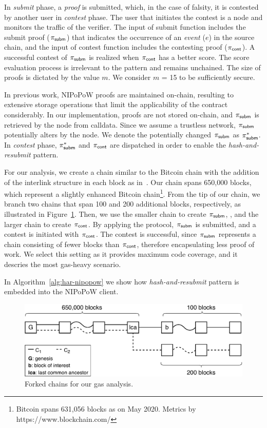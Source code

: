 In \emph{submit} phase, a \emph{proof} is submitted, which, in the case of
falsity, it is contested by another user in \emph{contest} phase. The user that
initiates the contest is a node and monitors the traffic of the verifier.  The
input of \textsf{submit} function includes the submit proof ($\mathsf{\pi_{subm}}$) that
indicates the occurrence of an \emph{event} ($e$) in the source chain, and the
input of \textsf{contest} function includes the contesting proof ($\mathsf{\pi_{cont}}$). A
successful contest of $\mathsf{\pi_{subm}}$ is realized when $\mathsf{\pi_{cont}}$ has a better score. The
score evaluation process is irrelevant to the pattern and remains unchained.
The size of proofs is dictated by the value $m$. We consider $m$ = 15 to be
sufficiently secure.

In previous work, NIPoPoW proofs are maintained on-chain, resulting to
extensive storage operations that limit the applicability of the contract
considerably. In our implementation, proofs are not stored on-chain, and $\mathsf{\pi_{subm}}$
is retrieved by the node from calldata. Since we assume a trustless network,
$\mathsf{\pi_{subm}}$ potentially alters by the node. We denote the potentially changed $\mathsf{\pi_{subm}}$
as $\mathsf{\pi_{subm}^*}$. In \emph{contest} phase, $\mathsf{\pi_{subm}^*}$ and $\mathsf{\pi_{cont}}$ are dispatched in order
to enable the \emph{hash-and-resubmit} pattern.

For our analysis, we create a chain similar to the Bitcoin chain with the
addition of the interlink structure in each block as in~\cite{gglou}. Our chain
spans 650,000 blocks, which represent a slightly enhanced Bitcoin
chain\footnote{Bitcoin spans 631,056 blocks as on May 2020. Metrics by
https://www.blockchain.com/}. From the tip of our chain, we branch two chains
that span 100 and 200 additional blocks, respectively, as illustrated in
Figure~\ref{fig:chains}. Then, we use the smaller chain to create  $\mathsf{\pi_{subm}}$, ,
and the larger chain to create $\mathsf{\pi_{cont}}$. By applying the protocol, $\mathsf{\pi_{subm}}$ is
submitted, and a contest is initiated with $\mathsf{\pi_{cont}}$. The contest is successful,
since $\mathsf{\pi_{subm}}$ represents a chain consisting of fewer blocks than $\mathsf{\pi_{cont}}$,
therefore encapsulating less proof of work. We select this setting as it
provides maximum code coverage, and it descries the most gas-heavy scenario.

In Algorithm~\ref{alg:har-nipopow} we show how \emph{hash-and-resubmit} pattern
is embedded into the NIPoPoW client.

\begin{figure}[!h]
    \begin{center}
        \includegraphics[width=1\columnwidth]{figures/nipopow-subm-cont}
    \end{center}
    \caption{Forked chains for our gas analysis.}
    \label{fig:chains}
\end{figure}

